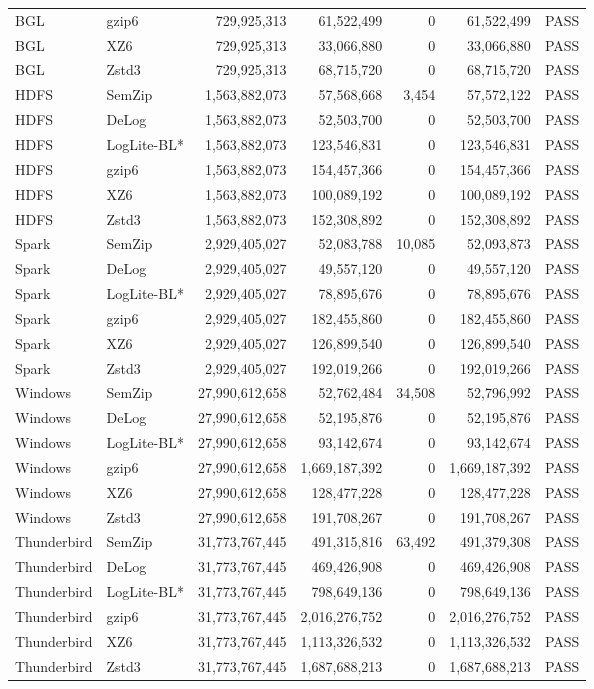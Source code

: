 \begin{longtable}{llrrrrl}
BGL & gzip6 & 729,925,313 & 61,522,499 & 0 & 61,522,499 & PASS \\
BGL & XZ6 & 729,925,313 & 33,066,880 & 0 & 33,066,880 & PASS \\
BGL & Zstd3 & 729,925,313 & 68,715,720 & 0 & 68,715,720 & PASS \\
HDFS & SemZip & 1,563,882,073 & 57,568,668 & 3,454 & 57,572,122 & PASS \\
HDFS & DeLog & 1,563,882,073 & 52,503,700 & 0 & 52,503,700 & PASS \\
HDFS & LogLite-BL* & 1,563,882,073 & 123,546,831 & 0 & 123,546,831 & PASS \\
HDFS & gzip6 & 1,563,882,073 & 154,457,366 & 0 & 154,457,366 & PASS \\
HDFS & XZ6 & 1,563,882,073 & 100,089,192 & 0 & 100,089,192 & PASS \\
HDFS & Zstd3 & 1,563,882,073 & 152,308,892 & 0 & 152,308,892 & PASS \\
Spark & SemZip & 2,929,405,027 & 52,083,788 & 10,085 & 52,093,873 & PASS \\
Spark & DeLog & 2,929,405,027 & 49,557,120 & 0 & 49,557,120 & PASS \\
Spark & LogLite-BL* & 2,929,405,027 & 78,895,676 & 0 & 78,895,676 & PASS \\
Spark & gzip6 & 2,929,405,027 & 182,455,860 & 0 & 182,455,860 & PASS \\
Spark & XZ6 & 2,929,405,027 & 126,899,540 & 0 & 126,899,540 & PASS \\
Spark & Zstd3 & 2,929,405,027 & 192,019,266 & 0 & 192,019,266 & PASS \\
Windows & SemZip & 27,990,612,658 & 52,762,484 & 34,508 & 52,796,992 & PASS \\
Windows & DeLog & 27,990,612,658 & 52,195,876 & 0 & 52,195,876 & PASS \\
Windows & LogLite-BL* & 27,990,612,658 & 93,142,674 & 0 & 93,142,674 & PASS \\
Windows & gzip6 & 27,990,612,658 & 1,669,187,392 & 0 & 1,669,187,392 & PASS \\
Windows & XZ6 & 27,990,612,658 & 128,477,228 & 0 & 128,477,228 & PASS \\
Windows & Zstd3 & 27,990,612,658 & 191,708,267 & 0 & 191,708,267 & PASS \\
Thunderbird & SemZip & 31,773,767,445 & 491,315,816 & 63,492 & 491,379,308 & PASS \\
Thunderbird & DeLog & 31,773,767,445 & 469,426,908 & 0 & 469,426,908 & PASS \\
Thunderbird & LogLite-BL* & 31,773,767,445 & 798,649,136 & 0 & 798,649,136 & PASS \\
Thunderbird & gzip6 & 31,773,767,445 & 2,016,276,752 & 0 & 2,016,276,752 & PASS \\
Thunderbird & XZ6 & 31,773,767,445 & 1,113,326,532 & 0 & 1,113,326,532 & PASS \\
Thunderbird & Zstd3 & 31,773,767,445 & 1,687,688,213 & 0 & 1,687,688,213 & PASS \\
\bottomrule\end{longtable}
